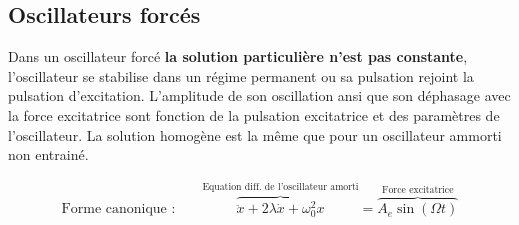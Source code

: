 \newpage

\subsection*{Oscillateurs forcés}

Dans un oscillateur forcé \textbf{la solution particulière n'est pas constante}, l'oscillateur se stabilise dans un régime permanent ou sa pulsation rejoint la pulsation d'excitation. L'amplitude de son oscillation ansi que son déphasage avec la force excitatrice sont fonction de la pulsation excitatrice et des paramètres de l'oscillateur. La solution homogène est la même que pour un oscillateur ammorti non entrainé.

\begin{align*}
    \text{Forme canonique : } && 
    \overbrace{\ddot{x} + 2 \lambda \dot{x} + \omega_0^2 x}
    ^\text{Equation diff. de l'oscillateur amorti}
    = \overbrace{A_e \sin \left(\Omega t \right)}
    ^\text{Force excitatrice} \\
\end{align*}


